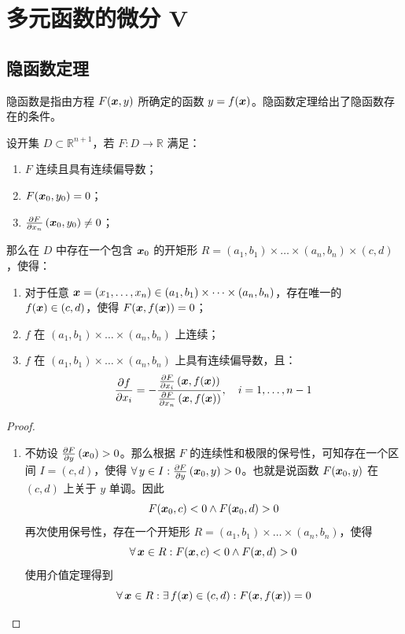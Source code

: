 \section{多元函数的微分 V}

\subsection{隐函数定理}

隐函数是指由方程 $F(\boldsymbol{x}, y)$ 所确定的函数 $y = f(\boldsymbol{x})$。隐函数定理给出了隐函数存在的条件。

\begin{theorem}[隐函数定理]
    设开集 $D \subset \mathbb{R}^{n + 1}$，若 $F: D \to \mathbb{R}$ 满足：
    \begin{enumerate}
        \item $F$ 连续且具有连续偏导数；
        \item $F(\boldsymbol{x}_0, y_0) = 0$；
        \item $\pdv{F}{x_n}\,(\boldsymbol{x}_0, y_0) \neq 0$；
    \end{enumerate}
    那么在 $D$ 中存在一个包含 $\boldsymbol{x}_0$ 的开矩形 $R = (a_1, b_1) \times \dots \times (a_n, b_n) \times (c, d)$，使得：
    \begin{enumerate}
        \item 对于任意 $\boldsymbol{x} = (x_1, \dots, x_n) \in (a_1, b_1) \times \dots \times (a_n, b_n)$，存在唯一的 $f(\boldsymbol{x}) \in (c, d)$，使得 $F(\boldsymbol{x}, f(\boldsymbol{x})) = 0$；
        \item $f$ 在 $(a_1, b_1) \times \dots \times (a_n, b_n)$ 上连续；
        \item $f$ 在 $(a_1, b_1) \times \dots \times (a_n, b_n)$ 上具有连续偏导数，且：
        $$
        \pdv{f}{x_i}(\boldsymbol{x}) = -\frac{\pdv{F}{x_i}\,(\boldsymbol{x}, f(\boldsymbol{x}))}{\pdv{F}{x_n}\,(\boldsymbol{x}, f(\boldsymbol{x}))}, \quad i = 1, \dots, n - 1
        $$
    \end{enumerate}

    \begin{proof}
        \ 
        \begin{enumerate}
            \item 不妨设 $\pdv{F}{y}\,(\boldsymbol{x}_0) > 0$。那么根据 $F$ 的连续性和极限的保号性，可知存在一个区间 $I = (c, d)$，使得 $\forall\,y \in I: \pdv{F}{y}\,(\boldsymbol{x}_0, y) > 0$。也就是说函数 $F(\boldsymbol{x}_0, y)$ 在 $(c, d)$ 上关于 $y$ 单调。因此
            $$
            F(\boldsymbol{x}_0, c) < 0 \land F(\boldsymbol{x}_0, d) > 0
            $$
            再次使用保号性，存在一个开矩形 $R = (a_1, b_1) \times \dots \times (a_n, b_n)$，使得
            $$
            \forall\,\boldsymbol{x} \in R: F(\boldsymbol{x}, c) < 0 \land F(\boldsymbol{x}, d) > 0
            $$
            使用介值定理得到
            $$
            \forall\,\boldsymbol{x} \in R: \exists\,f(\boldsymbol{x}) \in (c, d): F(\boldsymbol{x}, f(\boldsymbol{x})) = 0
            $$


\end{enumerate}
\end{proof}
\end{theorem}
